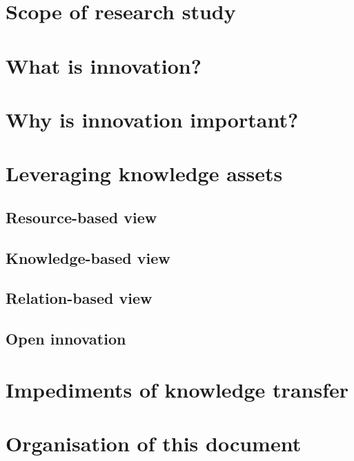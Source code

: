 
\section{Scope of research study}

\section{What is innovation?}

\section{Why is innovation important?}

\section{Leveraging knowledge assets}

\subsection{Resource-based view}

\subsection{Knowledge-based view}

\subsection{Relation-based view}

\subsection{Open innovation}

\section{Impediments of knowledge transfer}

\section{Organisation of this document}

